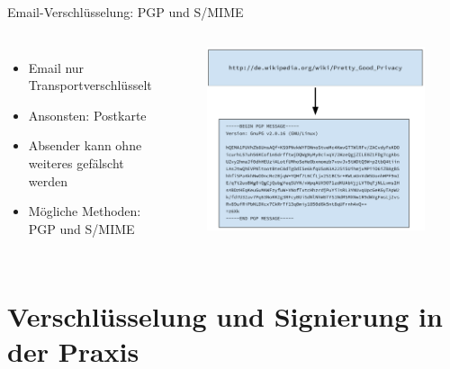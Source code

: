 \documentclass[10pt]{beamer}
\begin{document}
\begin{frame}[fragile]{Email-Verschlüsselung: PGP und S/MIME}
\begin{columns}[T,c,onlytextwidth]
\begin{itemize}
	\item Email nur Transportverschlüsselt
\item Ansonsten: Postkarte
\item Absender kann ohne weiteres gefälscht werden
\item Mögliche Methoden: \\PGP und S/MIME
\end{itemize}
\begin{figure}
	\includegraphics[width=1\textwidth]{images/pgp}
\end{figure}
\end{columns}
\end{frame}

\section{Verschlüsselung und Signierung in der Praxis}
\end{document}
